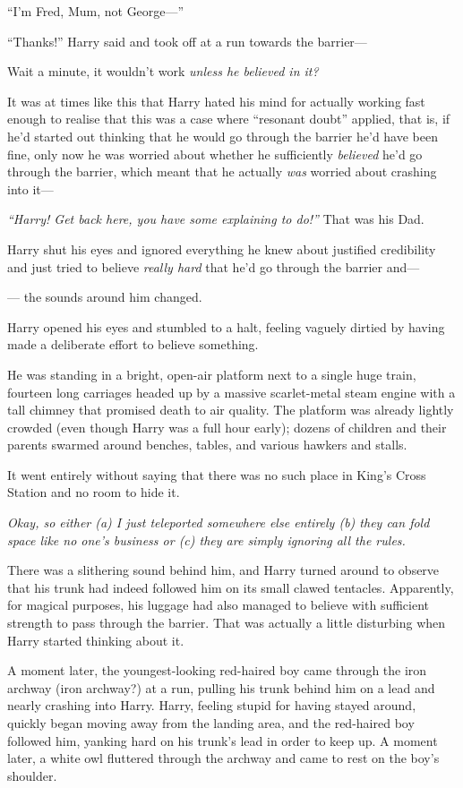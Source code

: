 ``I'm Fred, Mum, not George---''

``Thanks!'' Harry said and took off at a run towards the barrier---

Wait a minute, it wouldn't work \emph{unless he believed in it?}

It was at times like this that Harry hated his mind for actually working
fast enough to realise that this was a case where ``resonant doubt''
applied, that is, if he'd started out thinking that he would go through
the barrier he'd have been fine, only now he was worried about whether
he sufficiently \emph{believed} he'd go through the barrier, which meant
that he actually \emph{was} worried about crashing into it---

\emph{``Harry! Get back here, you have some explaining to do!''} That
was his Dad.

Harry shut his eyes and ignored everything he knew about justified
credibility and just tried to believe \emph{really hard} that he'd go
through the barrier and---

--- the sounds around him changed.

Harry opened his eyes and stumbled to a halt, feeling vaguely dirtied by
having made a deliberate effort to believe something.

He was standing in a bright, open-air platform next to a single huge
train, fourteen long carriages headed up by a massive scarlet-metal
steam engine with a tall chimney that promised death to air quality. The
platform was already lightly crowded (even though Harry was a full hour
early); dozens of children and their parents swarmed around benches,
tables, and various hawkers and stalls.

It went entirely without saying that there was no such place in King's
Cross Station and no room to hide it.

\emph{Okay, so either (a) I just teleported somewhere else entirely (b)
they can fold space like no one's business or (c) they are simply
ignoring all the rules.}

There was a slithering sound behind him, and Harry turned around to
observe that his trunk had indeed followed him on its small clawed
tentacles. Apparently, for magical purposes, his luggage had also
managed to believe with sufficient strength to pass through the barrier.
That was actually a little disturbing when Harry started thinking about
it.

A moment later, the youngest-looking red-haired boy came through the
iron archway (iron archway?) at a run, pulling his trunk behind him on a
lead and nearly crashing into Harry. Harry, feeling stupid for having
stayed around, quickly began moving away from the landing area, and the
red-haired boy followed him, yanking hard on his trunk's lead in order
to keep up. A moment later, a white owl fluttered through the archway
and came to rest on the boy's shoulder.


